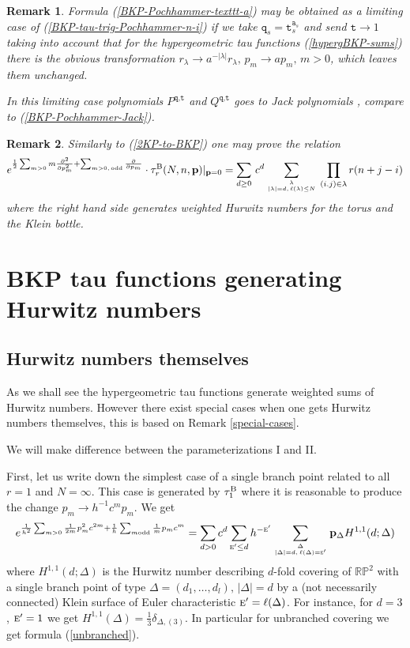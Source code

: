 \documentclass[a4paper,10pt]{article}
\newcommand{\bpow}{\mathbf{p}}
\theoremstyle{plain}
\newtheorem{Remark}{Remark}
\theoremstyle{remark}
\def\be{\begin{equation}}
\def\ee{\end{equation}}
\def\br{\begin{Remark}\rm\small}
\def\er{\end{Remark}}
\begin{document}
\br
Formula (\ref{BKP-Pochhammer-texttt-a}) may be obtained as a limiting case of (\ref{BKP-tau-trig-Pochhammer-n-i})
if we take $\texttt{q}_s=\texttt{t}_s^{\texttt{a}_s}$ and send $\texttt{t}\to 1$ taking into account
that for the hypergeometric tau functions  (\ref{hypergBKP-sums}) there is the obvious transformation
$r_\lambda \to a^{-|\lambda|}r_\lambda,\,p_m \to ap_m,\,m>0$,  which leaves them unchanged.

In this limiting case polynomials $P^{\texttt{q},\texttt{t}}$ and $Q^{\texttt{q},\texttt{t}}$
goes to Jack polynomials \cite{Mac}, compare to (\ref{BKP-Pochhammer-Jack}).
\er

\br \label{E=1 to E=0} Similarly to (\ref{2KP-to-BKP})
 one may prove the relation
\be\label{E=1--E=0}
 e^{\frac 12 \sum_{m>0} m \frac{\partial^2}{\partial p_m^2}+\sum_{m>0,\,{\rm odd}}
 \frac{\partial}{\partial p_m}}   \cdot\tau^{\rm B}_r(N,n,\bpow)|_{\bpow=0}=
 \sum_{d\ge 0}\, c^d \sum_{\lambda\atop |\lambda|=d,\,  \ell(\lambda)\le N}\,\prod_{(i.j)\in\lambda}r(n+j-i)
\ee
where the right hand side generates weighted Hurwitz numbers for the torus and the Klein bottle.
\er


\section{BKP tau functions generating Hurwitz numbers \label{BKP-tau-Hurwitz-section}}




\subsection{Hurwitz numbers themselves}

As we shall see the hypergeometric tau functions generate weighted sums of Hurwitz numbers.
However there exist special cases when one gets Hurwitz numbers themselves, this is based on Remark \ref{special-cases}.

We will make difference between the parameterizations I and II.

First, let us write down the simplest case of a single branch point related to all $r=1$ and $N=\infty$.
This case is generated by $\tau_1^{\rm B}$ where it is reasonable to produce the change $p_m\to h^{-1}c^m p_m$.
We get
\be\label{single-branch-point}
e^{\frac {1}{h^2}\sum_{m>0} \frac {1}{2m}p_m^2 c^{2m} +\frac 1h\sum_{m {\rm odd}} \frac 1m p_m c^m}=
\sum_{d>0} c^d \sum_{\textsc{e}' \le d} h^{-\textsc{e}'}\sum_{\Delta\atop |\Delta|=d,\,\ell(\Delta)=\textsc{e}'}\bpow_\Delta
H^{1,1}(d;\Delta)
\ee
where $H^{1,1}(d;\Delta)$ is the Hurwitz number describing $d$-fold covering of $\mathbb{RP}^2$ with a single
branch point of type $\Delta=(d_1,\dots,d_l),\,|\Delta|=d$ by a (not necessarily connected) Klein surface of
Euler characteristic $\textsc{e}'=\ell(\Delta)$. For instance, for $d=3$, $\textsc{e}'=1$ we get
$H^{1,1}(\Delta)=\frac 13\delta_{\Delta,(3)}$.
In particular for unbranched covering we get formula (\ref{unbranched}).
\end{document}
